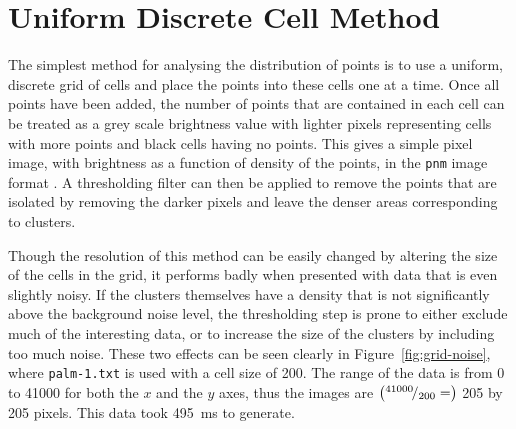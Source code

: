
\section{Uniform Discrete Cell Method}
\label{sec:simple_grid_method}

The simplest method for analysing the distribution of points is to use a
uniform, discrete grid of cells and place the points into these cells one at a
time. Once all points have been added, the number of points that are contained
in each cell can be treated as a grey scale brightness value with lighter
pixels representing cells with more points and black cells having no points.
This gives a simple pixel image, with brightness as a function of density of
the points, in the \texttt{pnm} image format \cite{murray1996encyclopedia}. A
thresholding filter can then be applied to remove the points that are isolated
by removing the darker pixels and leave the denser areas corresponding to
clusters.

Though the resolution of this method can be easily changed by altering the size
of the cells in the grid, it performs badly when presented with data that is
even slightly noisy. If the clusters themselves have a density that is not
significantly above the background noise level, the thresholding step is prone
to either exclude much of the interesting data, or to increase the size of the
clusters by including too much noise. These two effects can be seen clearly in
Figure~\ref{fig:grid-noise}, where \texttt{palm-1.txt} is used with a cell size
of 200. The range of the data is from 0 to \num{41000} for both the $x$ and the
$y$ axes, thus the images are $\left({}^{41000}\!/_{200} = \right)$ 205 by 205
pixels. This data took \SI{495}{\milli\second} to generate.

